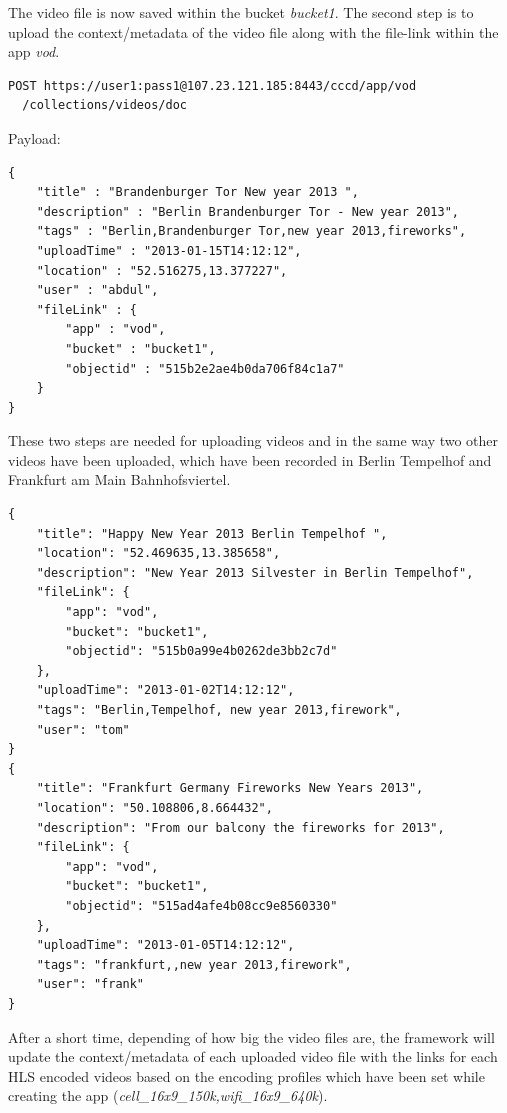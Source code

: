 The video file is now saved within the bucket \textit{bucket1}. The second step is to upload the context/metadata of the video file along with the file-link within the app \textit{vod}.
\begin{code}
\begin{verbatim}
POST https://user1:pass1@107.23.121.185:8443/cccd/app/vod
  /collections/videos/doc
\end{verbatim}
Payload:
\begin{verbatim}
{
	"title" : "Brandenburger Tor New year 2013 ",
	"description" : "Berlin Brandenburger Tor - New year 2013",
	"tags" : "Berlin,Brandenburger Tor,new year 2013,fireworks",
	"uploadTime" : "2013-01-15T14:12:12",
	"location" : "52.516275,13.377227",
	"user" : "abdul",
	"fileLink" : {
		"app" : "vod",
		"bucket" : "bucket1", 
		"objectid" : "515b2e2ae4b0da706f84c1a7"
	}
}
\end{verbatim}
\end{code}

These two steps are needed for uploading videos and in the same way two other videos have been uploaded, which have been recorded in Berlin Tempelhof and Frankfurt am Main Bahnhofsviertel. 
\begin{code}
\begin{verbatim}
{
	"title": "Happy New Year 2013 Berlin Tempelhof ",
	"location": "52.469635,13.385658",
	"description": "New Year 2013 Silvester in Berlin Tempelhof",
	"fileLink": {
		"app": "vod",
		"bucket": "bucket1",
		"objectid": "515b0a99e4b0262de3bb2c7d"
	},
	"uploadTime": "2013-01-02T14:12:12",
	"tags": "Berlin,Tempelhof, new year 2013,firework",
	"user": "tom"
}
{
	"title": "Frankfurt Germany Fireworks New Years 2013",
	"location": "50.108806,8.664432",
	"description": "From our balcony the fireworks for 2013",
	"fileLink": {
		"app": "vod",
		"bucket": "bucket1",
		"objectid": "515ad4afe4b08cc9e8560330"
	},
	"uploadTime": "2013-01-05T14:12:12",
	"tags": "frankfurt,,new year 2013,firework",
	"user": "frank"
}
\end{verbatim}
\end{code}

After a short time, depending of how big the video files are, the framework will update the context/metadata of each uploaded video file with the links for each \ac{HLS} encoded videos based on the encoding profiles which have been set while creating the app (\textit{cell\_16x9\_150k,wifi\_16x9\_640k}).

